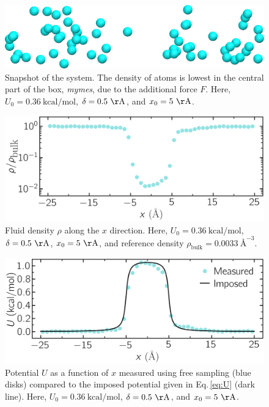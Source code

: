 \documentclass[9pt,tutorial]{livecoms}
\begin{document}
\begin{figure}
\centering
\includegraphics[width=\linewidth]{US-system-unbiased}
\caption{Snapshot of the system. The density of atoms is lowest in the central
part of the box, \textit{mymes}, due to the additional force $F$. Here,
$U_0 = 0.36~\text{kcal/mol}$, $\delta = 0.5~\mathrm{\AA{}}$, and $x_0 = 5~\mathrm{\AA{}}$.}
\label{fig:US-system-unbiased}
\end{figure}

\begin{figure}
\centering
\includegraphics[width=\linewidth]{US-density}
\caption{Fluid density $\rho$ along the $x$ direction. Here,
$U_0 = 0.36~\text{kcal/mol}$, $\delta = 0.5~\mathrm{\AA{}}$, $x_0 = 5~\mathrm{\AA{}}$,
and reference density $\rho_\text{bulk} = 0.0033~\text{\AA{}}^{-3}$.}
\label{fig:US-density}
\end{figure}

\begin{figure}
\centering
\includegraphics[width=\linewidth]{US-FreeSampling}
\caption{Potential $U$ as a function of $x$ measured using free sampling (blue disks)
compared to the imposed potential given in Eq.\,\eqref{eq:U} (dark line). Here,
$U_0 = 0.36~\text{kcal/mol}$, $\delta = 0.5~\mathrm{\AA{}}$, and $x_0 = 5~\mathrm{\AA{}}$.}
\label{fig:US-FreeSampling}
\end{figure}
\end{document}
